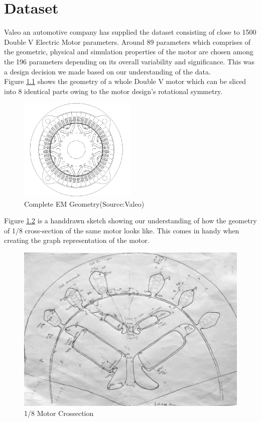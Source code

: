 \documentclass{report} %
\begin{document}
\newpage 

\chapter{Dataset} 
Valeo an automotive company has supplied the dataset consisting of close to 1500 Double V Electric Motor parameters. 
Around 89 parameters which comprises of the geometric, physical and simulation properties of the motor are chosen among the 196 parameters depending on its overall variability and significance.
This was a design decision we made based on our understanding of the data.\\
Figure \ref{fig:Full Motor} shows the geometry of a whole Double V motor which can be sliced into 8 identical parts owing to the motor design's rotational symmetry.

\begin{figure}[H]
    \centering
    \includegraphics[width=0.5\textwidth]{./ReportImages/FullMotorv2.png} 
    \caption{Complete EM Geometry(Source:Valeo)}
    \label{fig:Full Motor}
\end{figure}

Figure \ref{fig:1/8 Motor Crossection} is a handdrawn sketch showing our understanding of how the geometry of 1/8 cross-section of the same motor looks like.
This comes in handy when creating the graph representation of the motor.\\

\begin{figure}[H]
    \centering
    \includegraphics[width=1\textwidth]{./ReportImages/EMCrosssectionFiltered.png} 
    \caption{1/8 Motor Crossection}
    \label{fig:1/8 Motor Crossection}
\end{figure}
\end{document}
